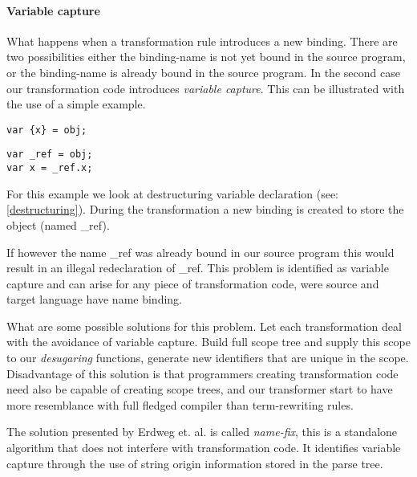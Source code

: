 \paragraph{Variable capture}
What happens when a transformation rule introduces a new binding. There are two possibilities either the binding-name is not yet bound in the source program, or the binding-name is already bound in the source program. In the second case our transformation code introduces \textit{variable capture}. This can be illustrated with the use of a simple example.

\begin{minipage}{0.45\textwidth}
\begin{lstlisting}[caption=Input JavaScript]
var {x} = obj;
\end{lstlisting}
\end{minipage}
\hfill
\begin{minipage}{0.45\textwidth}
\begin{lstlisting}[caption=Desugared JavaScript]
var _ref = obj;
var x = _ref.x;
\end{lstlisting}
\end{minipage}

For this example we look at destructuring variable declaration (see: \ref{destructuring}). During the transformation a new binding is created to store the object (named \_ref). 

If however the name \_ref was already bound in our source program this would result in an illegal redeclaration of \_ref. This problem is identified as variable capture and can arise for any piece of transformation code, were source and target language have name binding.

What are some possible solutions for this problem. Let each transformation deal with the avoidance of variable capture. Build full scope tree and supply this scope to our \textit{desugaring} functions, generate new identifiers that are unique in the scope. Disadvantage of this solution is that programmers creating transformation code need also be capable of creating scope trees, and our transformer start to have more resemblance with full fledged compiler than term-rewriting rules.

The solution presented by Erdweg et. al.\cite{Erdweg2014a} is called \textit{name-fix}, this is a standalone algorithm that does not interfere with transformation code. It identifies variable capture through the use of string origin\cite{Inostroza2014} information stored in the parse tree.

